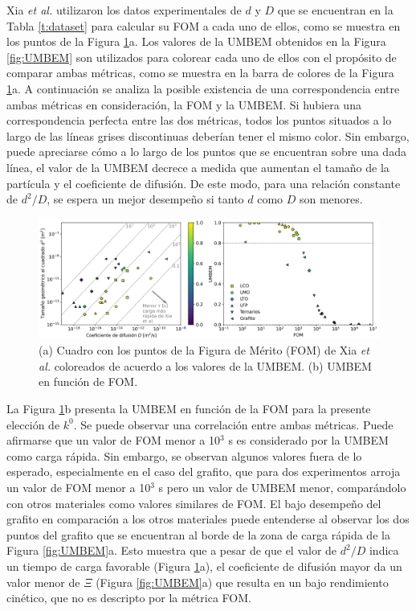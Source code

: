 Xia \textit{et al.} \cite{xia2022} utilizaron los datos experimentales de $d$ y $D$
que se encuentran en la Tabla \ref{t:dataset} para calcular su FOM a cada uno 
de ellos, como se muestra en los puntos de la Figura \ref{fig:xiacomp}a. Los 
valores de la UMBEM obtenidos en la Figura \ref{fig:UMBEM} son utilizados para
colorear cada uno de ellos con el propósito de comparar ambas métricas, como
se muestra en la barra de colores de la Figura \ref{fig:xiacomp}a. A continuación
se analiza la posible existencia de una correspondencia entre ambas métricas en 
consideración, la FOM y la UMBEM. Si hubiera una correspondencia perfecta entre
las dos métricas, todos los puntos situados a lo largo de las líneas grises 
discontinuas deberían tener el mismo color. Sin embargo, puede apreciarse cómo a lo largo de
los puntos que se encuentran sobre una dada línea, el valor de la UMBEM decrece a medida que aumentan el tamaño
de la partícula y el coeficiente de difusión. De
este modo, para una relación constante de $d^2/D$, se espera un mejor desempeño 
si tanto $d$ como $D$ son menores. 

\begin{figure}[h!]
    \centering
    \includegraphics[width=\textwidth]{FastCharging/umbem/xiacomp.png}
    \caption{(a) Cuadro con los puntos de la Figura de Mérito (FOM) de Xia 
    \textit{et al.} coloreados de acuerdo a los valores de la UMBEM. (b) UMBEM en 
    función de FOM.}
    \label{fig:xiacomp}
\end{figure}

La Figura \ref{fig:xiacomp}b presenta la UMBEM en función de la FOM para la 
presente elección de $k^0$. Se puede observar una correlación entre ambas métricas.
Puede afirmarse que un valor de FOM menor a 10$^3$ s es considerado por la UMBEM 
como carga rápida. Sin embargo, se observan algunos valores fuera de lo esperado,
especialmente en el caso del grafito, que para dos experimentos arroja un valor de 
FOM menor a 10$^3$ s pero un valor de UMBEM menor, comparándolo con otros 
materiales como valores similares de FOM. El bajo desempeño del grafito en 
comparación a los otros materiales puede entenderse al observar los dos puntos 
del grafito que se encuentran al borde de la zona de carga rápida de la Figura 
\ref{fig:UMBEM}a. Esto muestra que a pesar de que el valor de $d^2/D$ indica
un tiempo de carga favorable (Figura \ref{fig:xiacomp}a), el coeficiente de 
difusión mayor da un valor menor de $\Xi$ (Figura \ref{fig:UMBEM}a) que resulta
en un bajo rendimiento cinético, que no es descripto por la métrica FOM.

